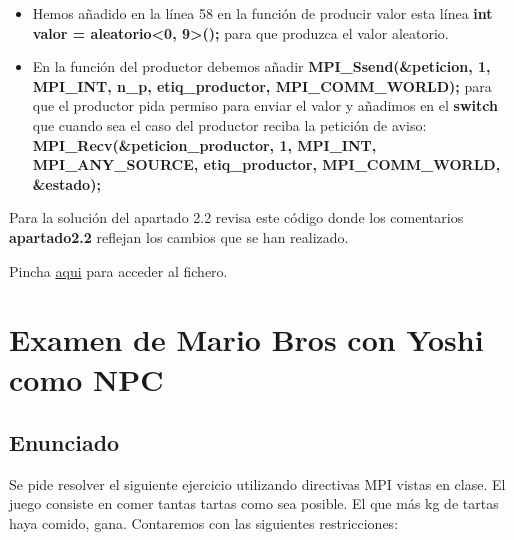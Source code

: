 \documentclass[a4paper,12pt]{article}
\begin{document}
\begin{itemize}
    \item Hemos añadido en la línea 58 en la función de producir valor esta línea \textbf{int valor = aleatorio<0, 9>();} para que produzca el valor aleatorio.
    \item En la función del productor debemos añadir \textbf{MPI\_Ssend(\&peticion, 1, MPI\_INT, n\_p, etiq\_productor, MPI\_COMM\_WORLD);} para que el productor pida permiso para enviar el valor y añadimos en el \textbf{switch} que cuando sea el caso del productor reciba la petición de aviso: \textbf{MPI\_Recv(\&peticion\_productor, 1, MPI\_INT, MPI\_ANY\_SOURCE, etiq\_productor, MPI\_COMM\_WORLD, \&estado);}
\end{itemize}


Para la solución del apartado 2.2 revisa este código donde los comentarios \textbf{apartado2.2} reflejan los cambios que se han realizado.


Pincha \href{https://github.com/ElblogdeIsmael/ElblogdeIsmael.github.io/blob/main/Subjects/Third/SCD/Examenes/SegundoParcial/ETSIIT/code/ExamenCarlos/prodcons2-mu.cpp}{aqui} para acceder al fichero.


\section{Examen de Mario Bros con Yoshi como NPC}

\subsection{Enunciado}

Se pide resolver el siguiente ejercicio utilizando directivas MPI vistas en clase. El juego consiste en comer tantas tartas como sea posible. El que más kg de tartas haya comido, gana. Contaremos con las siguientes restricciones:
\end{document}
